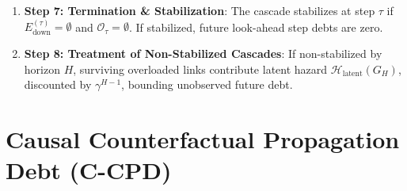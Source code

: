 \documentclass[pdflatex,sn-mathphys-num]{sn-jnl}
\theoremstyle{thmstyleone}
\theoremstyle{thmstyletwo}
\theoremstyle{thmstylethree}
\begin{document}
\begin{enumerate}
    \begin{equation}
    p_{\mathrm{fail}}(u) = \begin{cases}
    0 & \text{if } u \le \theta_{\mathrm{over}}, \\
    \min\left(1.0, \; p_{\mathrm{base}} + \beta_{\mathrm{over}} \cdot \frac{u - \theta_{\mathrm{over}}}{\theta_{\mathrm{over}}}\right) & \text{if } u > \theta_{\mathrm{over}}
    \end{cases}
    \end{equation}
    with base probability $p_{\mathrm{base}} = 0.60$ (BGP hold-down timeout rate \cite{caesar2005bgp}) and overload sensitivity $\beta_{\mathrm{over}} = 0.40$ (thermal amplifier trip sensitivity). If $\xi_e^{(\tau)} \le p_{\mathrm{fail}}(u_\tau(e))$, then $e \in E_{\mathrm{down}}^{(\tau)}$.
    \item \textbf{Step 7: Termination \& Stabilization}: The cascade stabilizes at step $\tau$ if $E_{\mathrm{down}}^{(\tau)} = \emptyset$ and $\mathcal{O}_\tau = \emptyset$. If stabilized, future look-ahead step debts are zero.
    \item \textbf{Step 8: Treatment of Non-Stabilized Cascades}: If non-stabilized by horizon $H$, surviving overloaded links contribute latent hazard $\mathcal{H}_{\mathrm{latent}}(G_H)$, discounted by $\gamma^{H-1}$, bounding unobserved future debt.
\end{enumerate}

\section{Causal Counterfactual Propagation Debt (C-CPD)}\label{sec4}
\end{document}
